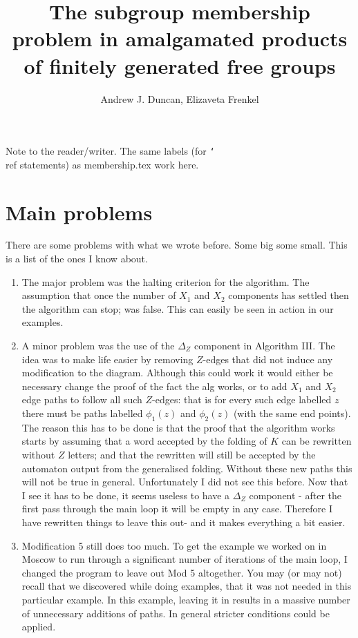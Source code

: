 \documentclass[a4paper,12pt]{article}
\title{The subgroup membership problem in amalgamated products of 
finitely generated free groups
}
\author{Andrew J. Duncan, Elizaveta Frenkel}
\numberwithin{equation}{section}
\numberwithin{figure}{section}
\newcommand{\be}{\begin{enumerate}}
\newcommand{\ee}{\end{enumerate}}
\begin{document}
Note to the reader/writer. The same labels (for \texttt{\char`\\}ref statements) as membership.tex work here.
\section{Main problems}
There are some problems with what we wrote before. Some big some small. This is a list of the
ones I know about.
\be
\item The major problem was the halting criterion for the algorithm. The assumption that once the 
number of $X_1$ and $X_2$ components has settled then the algorithm can stop; was false. This can
easily be seen in  action in our examples. 
\item A minor problem was the use of the $\Delta_Z$ component in Algorithm III. The idea was to make 
life easier by removing $Z$-edges that did not induce any modification to the diagram. Although this
could work it would either be necessary change the proof of the fact the alg works, 
or to add $X_1$ and $X_2$ edge paths to follow all such $Z$-edges: that
is for every such edge labelled $z$ there must be paths labelled $\phi_1(z)$ and $\phi_2(z)$ (with the same end points). 
The reason this has to be done is that the proof that the algorithm works starts by assuming that a word accepted
by the folding of $K$ can be rewritten without $Z$ letters; and that the rewritten will still 
be accepted by the automaton output from the 
generalised folding. Without these new paths this will not be true in general. 
Unfortunately I did not see this before. 
Now that I see it has to be done, it seems useless to have a $\Delta_Z$ component - 
after the first pass through the main loop it will be empty in any case. Therefore I have rewritten things
 to leave this out- and it makes everything a bit easier.  
\item Modification 5 still does too much. To get the example we worked on in Moscow to run through a significant number
of iterations of the main loop, I changed the program to leave out Mod 5 altogether. You may (or may not) recall
that we discovered while doing examples, that it was not needed in this particular example. In this example, leaving it
in results in a massive number of unnecessary additions of paths. In general stricter conditions could be applied.  
\ee
\end{document}
